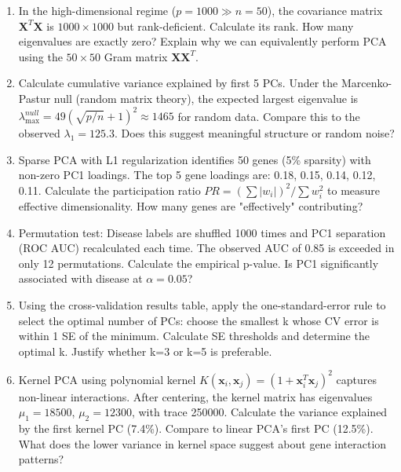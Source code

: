 \documentclass[12pt]{article}
\begin{document}
\begin{enumerate}[label=(\alph*)]
\item In the high-dimensional regime ($p=1000 \gg n=50$), the covariance matrix $\mathbf{X}^T\mathbf{X}$ is $1000 \times 1000$ but rank-deficient. Calculate its rank. How many eigenvalues are exactly zero? Explain why we can equivalently perform PCA using the $50 \times 50$ Gram matrix $\mathbf{X}\mathbf{X}^T$.

\item Calculate cumulative variance explained by first 5 PCs. Under the Marcenko-Pastur null (random matrix theory), the expected largest eigenvalue is $\lambda_{\max}^{null} = 49(\sqrt{p/n} + 1)^2 \approx 1465$ for random data. Compare this to the observed $\lambda_1 = 125.3$. Does this suggest meaningful structure or random noise?

\item Sparse PCA with L1 regularization identifies 50 genes (5\% sparsity) with non-zero PC1 loadings. The top 5 gene loadings are: 0.18, 0.15, 0.14, 0.12, 0.11. Calculate the participation ratio $PR = (\sum|w_i|)^2 / \sum w_i^2$ to measure effective dimensionality. How many genes are "effectively" contributing?

\item Permutation test: Disease labels are shuffled 1000 times and PC1 separation (ROC AUC) recalculated each time. The observed AUC of 0.85 is exceeded in only 12 permutations. Calculate the empirical p-value. Is PC1 significantly associated with disease at $\alpha = 0.05$?

\item Using the cross-validation results table, apply the one-standard-error rule to select the optimal number of PCs: choose the smallest k whose CV error is within 1 SE of the minimum. Calculate SE thresholds and determine the optimal k. Justify whether k=3 or k=5 is preferable.

\item Kernel PCA using polynomial kernel $K(\mathbf{x}_i, \mathbf{x}_j) = (1 + \mathbf{x}_i^T\mathbf{x}_j)^2$ captures non-linear interactions. After centering, the kernel matrix has eigenvalues $\mu_1 = 18500$, $\mu_2 = 12300$, with trace 250000. Calculate the variance explained by the first kernel PC (7.4\%). Compare to linear PCA's first PC (12.5\%). What does the lower variance in kernel space suggest about gene interaction patterns?
\end{enumerate}

\end{document}
